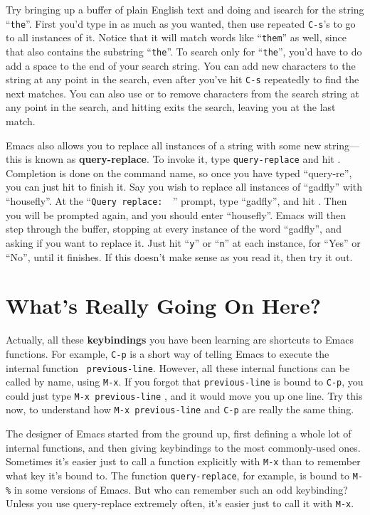         Try bringing up a buffer of plain English text and doing and
isearch for the string ``{\tt the}''.  First you'd type in as much as
you wanted, then use repeated {\tt C-s}'s to go to all instances of
it.  Notice that it will match words like ``{\tt them}'' as well,
since that also contains the substring ``{\tt the}''.  To search only
for ``{\tt the}'', you'd have to do add a space to the end of your
search string.  You can add new characters to the string at any point
in the search, even after you've hit {\tt C-s} repeatedly to find the
next matches.  You can also use  or  to
remove characters from the search string at any point in the search,
and hitting  exits the search, leaving you at the last
match.

        Emacs also allows you to replace all instances of a string
with some new string---this is known as {\bf query-replace}.  To
invoke it, type {\tt query-replace} and hit .
Completion is done on the command name, so once you have typed
``query-re'', you can just hit  to finish it.  Say you wish
to replace all instances of ``gadfly'' with ``housefly''.  At the
``{\tt Query replace:\, }'' prompt, type ``gadfly'', and hit
.  Then you will be prompted again, and you should enter
``housefly''.  Emacs will then step through the buffer, stopping at
every instance of the word ``gadfly'', and asking if you want to
replace it.  Just hit ``{\tt y}'' or ``{\tt n}'' at each instance, for
``Yes'' or ``No'', until it finishes.  If this doesn't make sense as
you read it, then try it out.

\section{What's Really Going On Here?}

        Actually, all these {\bf keybindings} you have been learning
are shortcuts to Emacs functions.  For example, {\tt C-p} is a short
way of telling Emacs to execute the internal function {\tt
previous-line}.  However, all these internal functions can be called
by name, using {\tt M-x}.  If you forgot that {\tt previous-line} is
bound to {\tt C-p}, you could just type {\tt M-x previous-line}
, and it would move you up one line.  Try this now, to
understand how {\tt M-x previous-line} and {\tt C-p} are really the
same thing.

        The designer of Emacs started from the ground up, first
defining a whole lot of internal functions, and then giving
keybindings to the most commonly-used ones.  Sometimes it's easier
just to call a function explicitly with {\tt M-x} than to remember
what key it's bound to.  The function {\tt query-replace}, for
example, is bound to {\tt M-\%} in some versions of Emacs.  But who
can remember such an odd keybinding?  Unless you use query-replace
extremely often, it's easier just to call it with {\tt M-x}.

